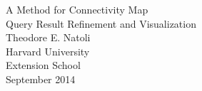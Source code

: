\documentclass[12pt]{article}
\begin{document}

\begin{titlepage}
\begin{center}
A Method for Connectivity Map\\
Query Result Refinement and Visualization\\[\baselineskip]
Theodore E. Natoli\\[\baselineskip]
Harvard University\\
Extension School\\[\baselineskip]
September 2014\\[\baselineskip]
\end{center}
\end{titlepage}

\end{document}
